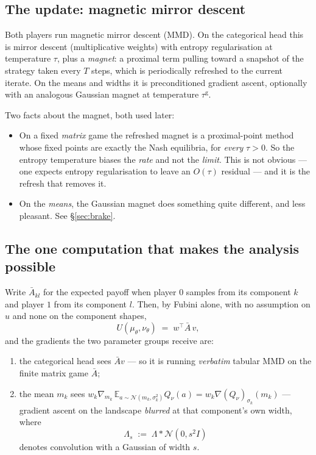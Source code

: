 \documentclass[11pt]{article}
\theoremstyle{definition}
\newcommand{\E}{\mathbb{E}}
\newcommand{\cN}{\mathcal{N}}
\begin{document}
\subsection*{The update: magnetic mirror descent}

Both players run magnetic mirror descent (MMD). On the categorical head this is
mirror descent (multiplicative weights) with entropy regularisation at
temperature $\tau$, plus a \emph{magnet}: a proximal term pulling toward a
snapshot of the strategy taken every $T$ steps, which is periodically refreshed
to the current iterate. On the means and widths it is preconditioned gradient
ascent, optionally with an analogous Gaussian magnet at temperature
$\tau^{\mathrm g}$.

Two facts about the magnet, both used later:
\begin{itemize}[leftmargin=1.4em, itemsep=2pt]
\item On a fixed \emph{matrix} game the refreshed magnet is a proximal-point
  method whose fixed points are exactly the Nash equilibria, for \emph{every}
  $\tau > 0$. So the entropy temperature biases the \emph{rate} and not the
  \emph{limit}. This is not obvious --- one expects entropy regularisation to
  leave an $O(\tau)$ residual --- and it is the refresh that removes it.
\item On the \emph{means}, the Gaussian magnet does something quite different,
  and less pleasant. See \S\ref{sec:brake}.
\end{itemize}

\subsection*{The one computation that makes the analysis possible}

Write $\bar A_{kl}$ for the expected payoff when player $0$ samples from its
component $k$ and player $1$ from its component $l$. Then, by Fubini alone, with
no assumption on $u$ and none on the component shapes,
\begin{equation}\label{eq:decomp}
  U(\mu_\theta, \nu_\theta) \;=\; w^\top \bar A\, v ,
\end{equation}
and the gradients the two parameter groups receive are:
\begin{enumerate}[leftmargin=1.8em, itemsep=2pt]
\item[(i)] the categorical head sees $\bar A v$ --- so it is running
  \emph{verbatim} tabular MMD on the finite matrix game $\bar A$;
\item[(ii)] the mean $m_k$ sees $w_k \nabla_{m_k}\, \E_{a \sim \cN(m_k,\sigma_k^2)}
  Q_\nu(a) = w_k \nabla (Q_\nu)_{\sigma_k}(m_k)$ --- gradient ascent on the
  landscape \emph{blurred} at that component's own width, where
  \begin{equation}\label{eq:blur}
    \Lambda_s \;:=\; \Lambda * \cN(0, s^2 I)
  \end{equation}
  denotes convolution with a Gaussian of width $s$.
\end{enumerate}
\end{document}
